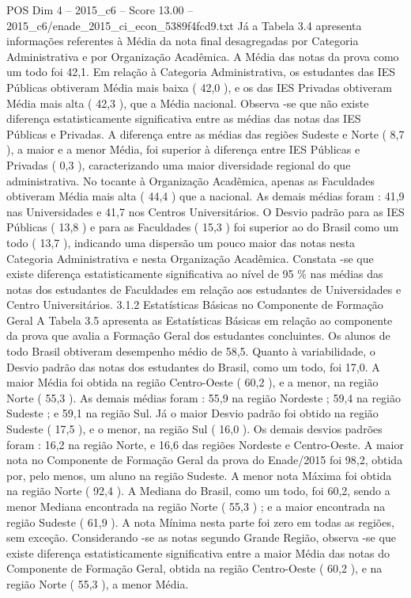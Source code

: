 \begin{textsample}{POS Dim 4 – 2015\_c6 – Score 13.00 – 2015\_c6/enade\_2015\_ci\_econ\_5389f4fcd9.txt}
Já a Tabela 3.4 apresenta informações referentes à Média da nota final desagregadas por Categoria Administrativa e por Organização Acadêmica.
A Média das notas da prova como um todo foi 42,1.
Em relação à Categoria Administrativa, os estudantes das IES Públicas obtiveram Média mais baixa ( 42,0 ), e os das IES Privadas obtiveram Média mais alta ( 42,3 ), que a Média nacional.
Observa -se que não existe diferença estatisticamente significativa entre as médias das notas das IES Públicas e Privadas.
A diferença entre as médias das regiões Sudeste e Norte ( 8,7 ), a maior e a menor Média, foi superior à diferença entre IES Públicas e Privadas ( 0,3 ), caracterizando uma maior diversidade regional do que administrativa.
No tocante à Organização Acadêmica, apenas as Faculdades obtiveram Média mais alta ( 44,4 ) que a nacional.
As demais médias foram : 41,9 nas Universidades e 41,7 nos Centros Universitários.
O Desvio padrão para as IES Públicas ( 13,8 ) e para as Faculdades ( 15,3 ) foi superior ao do Brasil como um todo ( 13,7 ), indicando uma dispersão um pouco maior das notas nesta Categoria Administrativa e nesta Organização Acadêmica.
Constata -se que existe diferença estatisticamente significativa ao nível de 95 \% nas médias das notas dos estudantes de Faculdades em relação aos estudantes de Universidades e Centro Universitários. 3.1.2 Estatísticas Básicas no Componente de Formação Geral A Tabela 3.5 apresenta as Estatísticas Básicas em relação ao componente da prova que avalia a Formação Geral dos estudantes concluintes.
Os alunos de todo Brasil obtiveram desempenho médio de 58,5.
Quanto à variabilidade, o Desvio padrão das notas dos estudantes do Brasil, como um todo, foi 17,0.
A maior Média foi obtida na região Centro-Oeste ( 60,2 ), e a menor, na região Norte ( 55,3 ).
As demais médias foram : 55,9 na região Nordeste ; 59,4 na região Sudeste ; e 59,1 na região Sul.
Já o maior Desvio padrão foi obtido na região Sudeste ( 17,5 ), e o menor, na região Sul ( 16,0 ).
Os demais desvios padrões foram : 16,2 na região Norte, e 16,6 das regiões Nordeste e Centro-Oeste.
A maior nota no Componente de Formação Geral da prova do Enade/2015 foi 98,2, obtida por, pelo menos, um aluno na região Sudeste.
A menor nota Máxima foi obtida na região Norte ( 92,4 ).
A Mediana do Brasil, como um todo, foi 60,2, sendo a menor Mediana encontrada na região Norte ( 55,3 ) ; e a maior encontrada na região Sudeste ( 61,9 ).
A nota Mínima nesta parte foi zero em todas as regiões, sem exceção.
Considerando -se as notas segundo Grande Região, observa -se que existe diferença estatisticamente significativa entre a maior Média das notas do Componente de Formação Geral, obtida na região Centro-Oeste ( 60,2 ), e na região Norte ( 55,3 ), a menor Média.

\end{textsample}

